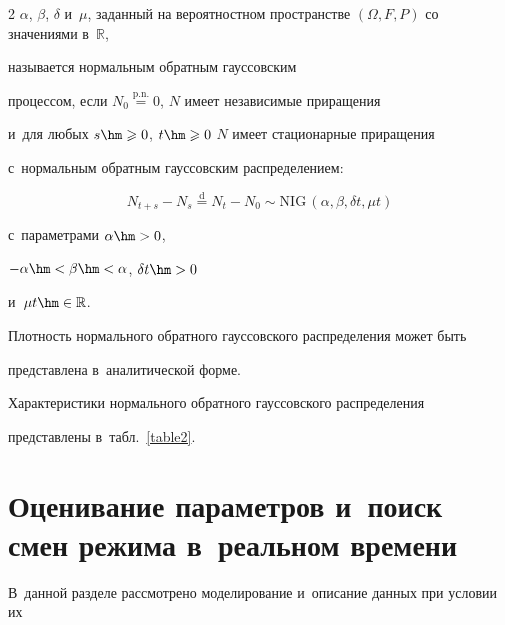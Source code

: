 \begin{multicols}{2}
$\alpha$, $\beta$, $\delta$ и~$\mu$, заданный на вероятностном пространстве $(\Omega, 


F, P)$ со значениями  в~$\mathbb{R}$,\linebreak


 называется нормальным обратным гауссовским 


процессом, если $N_0 \overset{\mathrm{p.n.}}{=} 0$, $N$ имеет независимые приращения 


и~для любых $s \hm\geqslant 0$, $t \hm\geqslant 0$ $N$ имеет стационарные приращения 


с~нормальным обратным гауссовским распределением:


$$


    N_{t+s} - N_s  \overset{\mathrm{d}}{=} N_t - N_0 \sim 


\mathrm{NIG}\,( \alpha, \beta, \delta t, \mu t) 


  $$


        с~параметрами $\alpha \hm> 0$, 


        $-\alpha \hm< \beta \hm< \alpha$, $\delta t\hm > 0$ 


и~$\mu t \hm\in  \mathbb{R}$.





\smallskip





    Плотность нормального обратного гауссовского распределения может быть 


представлена в~аналитической форме.





        Характеристики нормального обратного гауссовского распределения 


представлены в~табл.~\ref{table2}.











\section {Оценивание параметров и~поиск смен режима в~реальном времени}





В~данной разделе рассмотрено моделирование и~описание данных при условии их 



\end{multicols}
